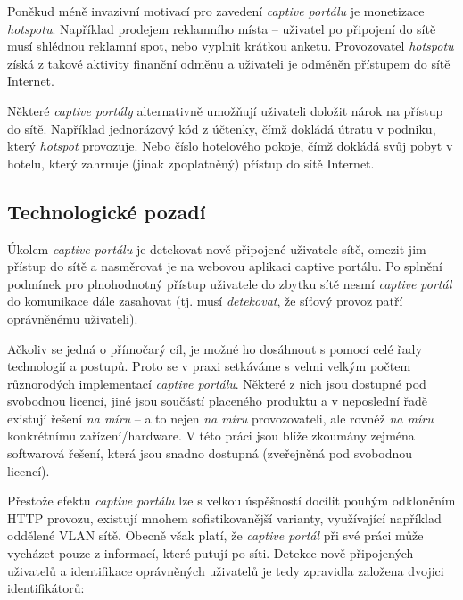 \documentclass[thesis=M,czech]{FITthesis}[2012/10/20]
\begin{document}
Poněkud méně invazivní motivací pro zavedení \textit{captive portálu} je monetizace \textit{hotspotu}. Například prodejem reklamního místa -- uživatel po připojení do sítě musí shlédnou reklamní spot, nebo vyplnit krátkou anketu. Provozovatel \textit{hotspotu} získá z takové aktivity finanční odměnu a uživateli je odměněn přístupem do sítě Internet.

Některé \textit{captive portály} alternativně umožňují uživateli doložit nárok na přístup do sítě. Například jednorázový kód z účtenky, čímž dokládá útratu v podniku, který \textit{hotspot} provozuje. Nebo číslo hotelového pokoje, čímž dokládá svůj pobyt v hotelu, který zahrnuje (jinak zpoplatněný) přístup do sítě Internet.

\subsection{Technologické pozadí}
\label{subsec:technologicke-pozadi}


Úkolem \textit{captive portálu} je detekovat nově připojené uživatele sítě, omezit jim přístup do sítě a nasměrovat je na webovou aplikaci captive portálu. Po splnění podmínek pro plnohodnotný přístup uživatele do zbytku sítě nesmí \textit{captive portál} do komunikace dále zasahovat (tj. musí \textit{detekovat}, že síťový provoz patří oprávněnému uživateli).

Ačkoliv se jedná o přímočarý cíl, je možné ho dosáhnout s pomocí celé řady technologií a postupů. Proto se v praxi setkáváme s velmi velkým počtem různorodých implementací \textit{captive portálu}. Některé z nich jsou dostupné pod svobodnou licencí, jiné jsou součástí placeného produktu a v neposlední řadě existují řešení \textit{na míru} -- a to nejen \textit{na míru} provozovateli, ale rovněž \textit{na míru} konkrétnímu zařízení/hardware. V této práci jsou blíže zkoumány zejména softwarová řešení, která jsou snadno dostupná (zveřejněná pod svobodnou licencí).


Přestože efektu \textit{captive portálu} lze s velkou úspěšností docílit pouhým odkloněním HTTP provozu, existují mnohem sofistikovanější varianty, využívající například oddělené VLAN sítě. Obecně však platí, že \textit{captive portál} při své práci může vycházet pouze z informací, které putují po síti. Detekce nově připojených uživatelů a identifikace oprávněných uživatelů je tedy zpravidla založena dvojici identifikátorů:
\end{document}
